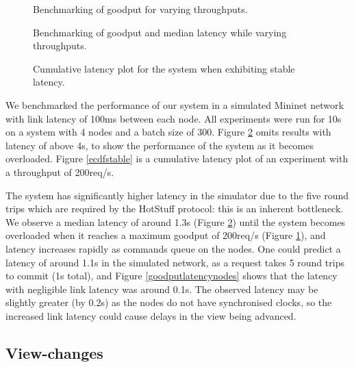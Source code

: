 \begin{figure}[h!]
\centering
\resizebox{.6\textwidth}{!}{}
\caption{Benchmarking of goodput for varying throughputs.}
\label{throughoutgoodputmininet}
\end{figure}

\begin{figure}[h!]
\centering
\resizebox{.5\textwidth}{!}{}
\caption{Benchmarking of goodput and median latency while varying throughputs.}
\label{goodputlatencymininet}
\end{figure}

\begin{figure}[h!]
\centering
\resizebox{.6\textwidth}{!}{}
\caption{Cumulative latency plot for the system when exhibiting stable latency.}
\label{ecdfmininet}
\end{figure}

We benchmarked the performance of our system in a simulated Mininet network \cite{mininet,lantzNetworkLaptopRapid2010} with link latency of 100ms between each node. All experiments were run for 10s on a system with 4 nodes and a batch size of 300. Figure \ref{goodputlatencymininet} omits results with latency of above 4s, to show the performance of the system as it becomes overloaded. Figure \ref{ecdfstable} is a cumulative latency plot of an experiment with a throughput of 200req/s.

The system has significantly higher latency in the simulator due to the five round trips which are required by the HotStuff protocol: this is an inherent bottleneck. We observe a median latency of around 1.3s (Figure \ref{goodputlatencymininet}) until the system becomes overloaded when it reaches a maximum goodput of 200req/s (Figure \ref{throughoutgoodputmininet}), and latency increases rapidly as commands queue on the nodes. One could predict a latency of around 1.1s in the simulated network, as a request takes 5 round trips to commit (1s total), and Figure \ref{goodputlatencynodes} shows that the latency with negligible link latency was around 0.1s. The observed latency may be slightly greater (by 0.2s) as the nodes do not have synchronised clocks, so the increased link latency could cause delays in the view being advanced.

\subsection{View-changes} \label{viewchangeeval}

